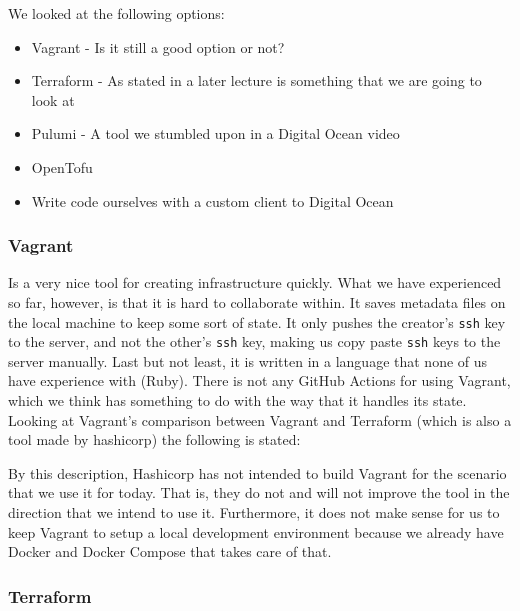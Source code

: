 We looked at the following options:
\begin{itemize}
    \item Vagrant - Is it still a good option or not?
    \item Terraform - As stated in a later lecture is something that we are going to look at
    \item Pulumi - A tool we stumbled upon in a Digital Ocean video
    \item OpenTofu
    \item Write code ourselves with a custom client to Digital Ocean
\end{itemize}

\subsubsection{Vagrant}

Is a very nice tool for creating infrastructure quickly. What we have experienced so far, however, is that it is hard to collaborate within. It saves metadata files on the local machine to keep some sort of state. It only pushes the creator's \texttt{ssh} key to the server, and not the other's \texttt{ssh} key, making us copy paste \texttt{ssh} keys to the server manually. Last but not least, it is written in a language that none of us have experience with (Ruby).
There is not any GitHub Actions for using Vagrant, which we think has something to do with the way that it handles its state. Looking at Vagrant's comparison between Vagrant and Terraform (which is also a tool made by hashicorp) the following is stated:



By this description, Hashicorp has not intended to build Vagrant for the scenario that we use it for today. That is, they do not and will not improve the tool in the direction that we intend to use it. Furthermore, it does not make sense for us to keep Vagrant to setup a local development environment because we already have Docker and Docker Compose that takes care of that.

\subsubsection{Terraform}

